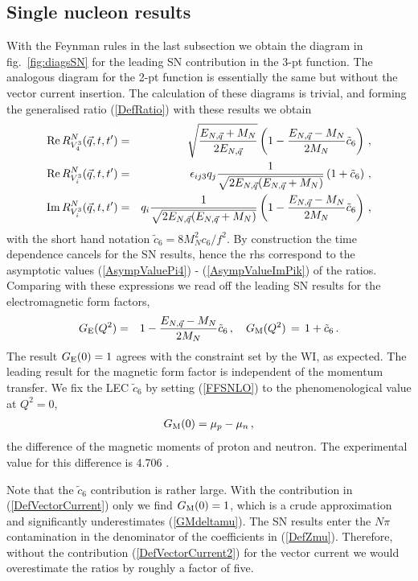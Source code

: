 \documentclass[11pt,prd,aps,showpacs,eqsecnum,floatfix,nofootinbib,preprint,tightenlines]{revtex4}
\newcommand{\bea}{\begin{eqnarray}}
\newcommand{\eea}{\end{eqnarray}}
\newcommand{\pref}[1]{(\ref{#1})}
\newcommand{\ENq}{E_{N,\vec{q}}}
\newcommand{\GM}{G_{\rm M}}
\begin{document}
\begin{appendix}
\subsection{Single nucleon results}\label{app:SNresults}
With the Feynman rules in the last subsection we obtain the diagram in fig.\ \ref{fig:diagsSN} for the leading SN contribution in the 3-pt function. The analogous diagram for the 2-pt function is essentially the same but without the vector current insertion. The calculation of these diagrams is trivial, and forming the generalised ratio \pref{DefRatio} with these results we obtain
\begin{eqnarray}
{\rm Re}\,R^N_{V^3_{4}} (\vec{q},t,t')& = & \sqrt{\frac{\ENq+M_N}{2\ENq}} \left(1- \frac{\ENq -M_N}{2 M_N} \tilde c_6\right)      \,,\label{RSN4}\\
{\rm Re}\,R^N_{V^3_{i}}(\vec{q},t,t') & = & \epsilon_{ij3}q_j \frac{1}{\sqrt{2\ENq(\ENq +M_N)}}  \left(1+ \tilde c_6\right)\,,\label{ReRSNk}\\
{\rm Im}\,R^N_{V^3_{i}}(\vec{q},t,t') & = & q_i \frac{1}{\sqrt{2\ENq(\ENq +M_N)}}  \left(1- \frac{\ENq -M_N}{2 M_N} \tilde c_6\right)\,,\label{ImRSNk}
\end{eqnarray}
with the short hand notation $\tilde c_6 = 8 M_N^2c_6/f^2$. By construction the time dependence cancels for the SN results, hence the rhs correspond to the asymptotic values \pref{AsympValuePi4} - \pref{AsympValueImPik} of the ratios. Comparing with these expressions we read off the leading SN results for the electromagnetic form factors,
\begin{eqnarray}\label{FFSNLO}
G_{\rm E}(Q^2)&  =  & 1- \frac{\ENq -M_N}{2 M_N} \tilde c_6\,,\quad
G_{\rm M}(Q^2) \, = \, 1+\tilde c_6\,.
\end{eqnarray}
The result $G_{\rm E}(0)=1$ agrees with the constraint set by the WI, as expected. The leading result for the magnetic form factor is independent of the momentum transfer. We fix the LEC $\tilde c_6$ by setting \pref{FFSNLO} to the phenomenological value at $Q^2=0$,
\bea\label{GMdeltamu}
\GM(0)=\mu_p - \mu_n\,,
\eea
the difference of the magnetic moments of proton and neutron. The experimental value for this difference is 4.706 \cite{Zyla:2020zbs}. 

Note that the $\tilde c_6$ contribution is rather large. With the contribution in \pref{DefVectorCurrent} only we find $\GM(0)=1$, which is a crude approximation and significantly underestimates \pref{GMdeltamu}. The SN results enter the $N\pi$ contamination in the denominator of the coefficients in \pref{DefZmu}. Therefore, without the contribution \pref{DefVectorCurrent2} for the vector current we would overestimate the ratios by roughly a factor of five.


\end{appendix}
\end{document}
